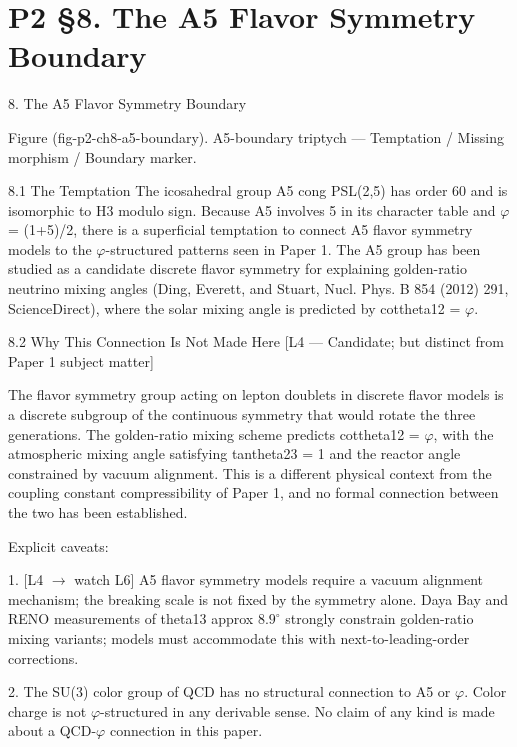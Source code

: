 
\section{P2 §8. The A5 Flavor Symmetry Boundary}

8. The A5 Flavor Symmetry Boundary

         Figure (fig-p2-ch8-a5-boundary). A5-boundary triptych --- Temptation / Missing morphism /
                                             Boundary marker.

  8.1 The Temptation
  The icosahedral group A5 cong PSL(2,5) has order 60 and is isomorphic to H3 modulo
  sign. Because A5 involves 5 in its character table and $\varphi$ = (1+5)/2, there is a superficial
  temptation to connect A5 flavor symmetry models to the $\varphi$-structured patterns seen in
  Paper 1. The A5 group has been studied as a candidate discrete flavor symmetry for
  explaining golden-ratio neutrino mixing angles (Ding, Everett, and Stuart, Nucl. Phys. B
  854 (2012) 291, ScienceDirect), where the solar mixing angle is predicted by
  cottheta12 = $\varphi$.

  8.2 Why This Connection Is Not Made Here [L4 --- Candidate; but
  distinct from Paper 1 subject matter]

  The flavor symmetry group acting on lepton doublets in discrete flavor models is a
  discrete subgroup of the continuous symmetry that would rotate the three generations.
  The golden-ratio mixing scheme predicts cottheta12 = $\varphi$, with the atmospheric mixing
  angle satisfying tantheta23 = 1 and the reactor angle constrained by vacuum
  alignment. This is a different physical context from the coupling constant
  compressibility of Paper 1, and no formal connection between the two has been
  established.

  Explicit caveats:

  1. [L4 $\rightarrow$ watch L6] A5 flavor symmetry models require a vacuum alignment mechanism;
  the breaking scale is not fixed by the symmetry alone. Daya Bay and RENO
  measurements of theta13 approx 8.$9^{\circ}$ strongly constrain golden-ratio mixing variants;
  models must accommodate this with next-to-leading-order corrections.

  2. The SU(3) color group of QCD has no structural connection to A5 or $\varphi$. Color charge
  is not $\varphi$-structured in any derivable sense. No claim of any kind is made about a QCD-$\varphi$
  connection in this paper.

